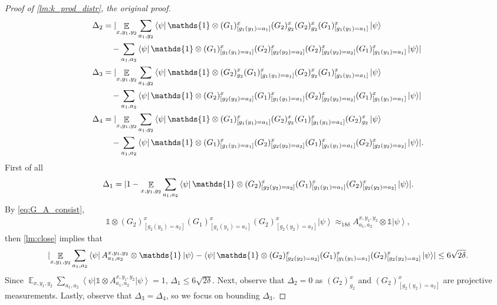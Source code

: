 \documentclass[11pt]{article}
\theoremstyle{plain}
\theoremstyle{definition}
\DeclarePairedDelimiter{\abs}{\lvert}{\rvert}
\newcommand {\bra} [1] {\ensuremath{ \left\langle #1 \right| }}
\newcommand {\ket} [1] {\ensuremath{ \left| #1 \right\rangle }}
\DeclareMathOperator*{\bigE}{\mathbb{E}}
\newcommand {\id} {\ensuremath{\mathds{1}}}
\newcommand{\x}{\otimes}
\newcommand{\appd}[1]{\approx_{#1}}
\newcommand{\1}{\mathbb{1}} %
\begin{document}
\begin{proof}[Proof of \cref{lm:k_prod_distr}, the original proof]
\begin{align*}
		\Delta_2 &= \abs{ 
		\bigE_{x,y_1,y_2} \sum_{a_1, g_2}
		\bra{\psi} \id \x (G_1)^x_{[g_1(y_1) = a_1]} (G_2)^x_{g_2}  (G_2)^x_{g_2}  (G_1)^x_{[g_1(y_1) = a_1]}  \ket{\psi} \\ 
		&\quad -
		 \sum_{a_1, a_2} \bra{\psi}  
		 \id \x (G_1)^x_{[g_1(y_1) = a_1]}(G_2)^x_{[g_2(y_2) = a_2]} (G_2)^x_{[g_2(y_2) = a_2]} (G_1)^x_{[g_1(y_1) = a_1]}  \ket{\psi}} \\
		\Delta_3 &=\abs{\bigE_{x,y_1,y_2} \sum_{a_1, g_2}
		\bra{\psi}  \id \x (G_2)^x_{g_2} (G_1)^x_{[g_1(y_1) = a_1]}   (G_2)^x_{g_2}  (G_1)^x_{[g_1(y_1) = a_1]}  \ket{\psi} \\ 
		&\quad -
		 \sum_{a_1, a_2} \bra{\psi}  \id \x
		(G_2)^x_{[g_2(y_2) = a_2]} (G_1)^x_{[g_1(y_1) = a_1]}  (G_2)^x_{[g_2(y_2) = a_2]} (G_1)^x_{[g_1(y_1) = a_1]}  \ket{\psi}} \\
		\Delta_4 &=\abs{\bigE_{x,y_1,y_2} \sum_{a_1, g_2}
		\bra{\psi}  \id \x (G_1)^x_{[g_1(y_1) = a_1]}   (G_2)^x_{g_2}  (G_1)^x_{[g_1(y_1) = a_1]} (G_2)^x_{g_2} \ket{\psi} \\ 
		&\quad -
		 \sum_{a_1, a_2} \bra{\psi}  \id \x
		 (G_1)^x_{[g_1(y_1) = a_1]}  (G_2)^x_{[g_2(y_2) = a_2]} (G_1)^x_{[g_1(y_1) = a_1]} (G_2)^x_{[g_2(y_2) = a_2]}  \ket{\psi}}	.
	\end{align*}
	First of all
	\begin{align*}
		\Delta_1 = \abs{ 1 - \bigE_{x,y_1,y_2} \sum_{a_1,a_2}
		\bra{\psi}  \id \x (G_2)^x_{[g_2(y_2) = a_2]} 
		(G_1)^x_{[g_1(y_1) = a_1]} (G_2)^x_{[g_2(y_2) = a_2]}  \ket{\psi}}.
	\end{align*}
	By \cref{eq:G_A_consist},
	\begin{align*}
		\id \x (G_2)^x_{[g_2(y_2) = a_2]} 
		(G_1)^x_{[g_1(y_1) = a_1]} (G_2)^x_{[g_2(y_2) = a_2]}  \ket{\psi}
		\appd{ 18 \delta}  A^{x,y_1,y_2}_{a_1,a_2} \x \id \ket{\psi},
	\end{align*}
	then \cref{lm:close} implies that 
	\begin{align*}
		\abs{ \bigE_{x,y_1,y_2} \sum_{a_1, a_2} \bra{\psi}  A^{x,y_1,y_2}_{a_1,a_2} \x \id \ket{\psi} - \bra{\psi} \id \x (G_2)^x_{[g_2(y_2) = a_2]} 
		(G_1)^x_{[g_1(y_1) = a_1]} (G_2)^x_{[g_2(y_2) = a_2]} \ket{\psi} } \leq 6\sqrt{2\delta}.
	\end{align*}
	Since $\bigE_{x,y_1,y_2} \sum_{a_1, a_2} \bra{\psi} \id \x A^{x,y_1,y_2}_{a_1,a_2} \ket{\psi} = 1$, 
	$\Delta_1 \leq 6\sqrt{2\delta}$.
	Next, observe that $\Delta_2 = 0$ as $(G_2)^x_{g_2}$ and $(G_2)^x_{[g_2(y_2)= a_2]}$ are projective measurements.
	Lastly, observe that $\Delta_3 = \Delta_4$, so we focus on bounding $\Delta_3$.

\end{proof}
\end{document}
